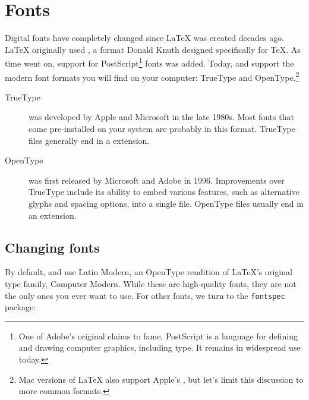 \chapter{Fonts}
\label{fonts}

Digital fonts have completely changed since \LaTeX{} was created decades ago.
\LaTeX{} originally used \MF,
a format Donald Knuth designed specifically for \TeX{}.
As time went on, support for PostScript\footnote{One of
Adobe's original claims to fame,
PostScript is a language for defining and drawing computer graphics,
including type. It remains in widespread use today.} fonts was added.
Today, \LuaLaTeX{} and \XeLaTeX{} support the modern font formats you will find
on your computer:
TrueType and OpenType.\punckern\footnote{Mac versions of \LaTeX{} also support
Apple's , but let's limit this discussion to
more common formats.}

\begin{description}
\item[TrueType] was developed by Apple and Microsoft in the late 1980s.
    Most fonts that come pre-installed on your system are probably
    in this format.
    TrueType files generally end in a  extension.
\item[OpenType] was first released by Microsoft and Adobe in 1996.
    Improvements over TrueType include its ability to embed
    various features, such as alternative glyphs
    and spacing options, into a single file.
    OpenType files usually end in an  extension.
\end{description}

\section{Changing fonts}

By default, \LuaLaTeX{} and \XeLaTeX{} use Latin Modern,
an OpenType rendition of \LaTeX's original type family, Computer Modern.
While these are high-quality fonts,
they are not the only ones you ever want to use.
For other fonts, we turn to the \texttt{fontspec} package:

